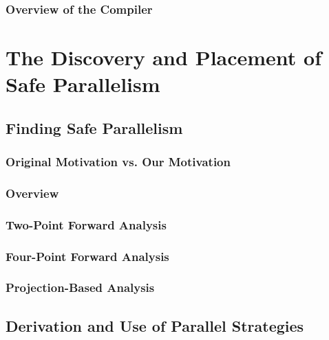 \documentclass[openright, dottedtoc, headinclude, footinclude=true, a4paper, numbers=noenddot]{scrreprt}
\begin{document}
        \section{Overview of the Compiler}
        \label{sec:overview}
        

\part{The Discovery and Placement of Safe Parallelism}
\label{part:static}

    \chapter{Finding Safe Parallelism}
    \label{chap:discovery} 
    

        \section{Original Motivation vs. Our Motivation}
        
    
        \section{Overview}
        \label{sec:strictnessOverview}
        
    
        \section{Two-Point Forward Analysis}
        \label{sec:twoPoint}
        
    
        \section{Four-Point Forward Analysis}
        \label{sec:fourPoint}
        
    
        \section{Projection-Based Analysis}
        \label{sec:projections}
        


    \chapter{Derivation and Use of Parallel Strategies}
    \label{chap:derivation}
    
\end{document}
